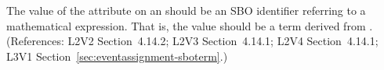 The value of the  attribute on an \EventAssignment should be an
SBO identifier referring to a mathematical expression.  That is, the value
should be a term derived from \sbomathformula.  (References: L2V2 Section~4.14.2;
L2V3 Section~4.14.1; L2V4 Section~4.14.1; L3V1 Section~\ref{sec:eventassignment-sboterm}.)
